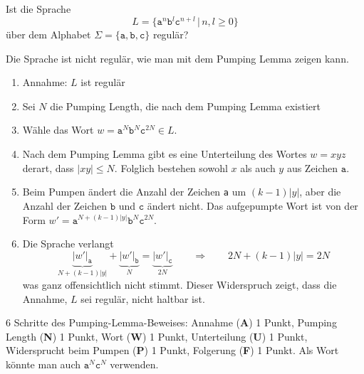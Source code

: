 Ist die Sprache
\[
L = \{ \texttt{a}^n \texttt{b}^l \texttt{c}^{n+l}\,|\, n,l\ge 0\}
\]
über dem Alphabet $\Sigma=\{\texttt{a},\texttt{b},\texttt{c}\}$ regulär?

\begin{loesung}
Die Sprache ist nicht regulär, wie man mit dem Pumping Lemma zeigen kann.
\begin{enumerate}
\item Annahme: $L$ ist regulär
\item Sei $N$ die Pumping Length, die nach dem Pumping Lemma existiert
\item Wähle das Wort $w=\texttt{a}^N \texttt{b}^N \texttt{c}^{2N}\in L$.
\item Nach dem Pumping Lemma gibt es eine Unterteilung des Wortes $w=xyz$
derart, dass $|xy|\le N$. Folglich bestehen sowohl $x$ als auch $y$ aus
Zeichen $\texttt{a}$.
\item Beim Pumpen ändert die Anzahl der Zeichen \texttt{a} um $(k-1)|y|$,
aber die Anzahl der Zeichen $\texttt{b}$ und $\texttt{c}$ ändert nicht.
Das aufgepumpte Wort ist von der Form
$w'=\texttt{a}^{N+(k-1)|y|}\texttt{b}^N\texttt{c}^{2N}$.
\item
Die Sprache verlangt
\[
\underbrace{|w'|_{\texttt{a}}}_{\displaystyle N+(k-1)|y|}
+
\underbrace{|w'|_{\texttt{b}}}_{\displaystyle N}
=
\underbrace{|w'|_{\texttt{c}}}_{\displaystyle 2N}
\qquad\Rightarrow\qquad
2N+(k-1)|y|=2N
\]
was ganz offensichtlich nicht stimmt.
Dieser Widerspruch zeigt, dass die Annahme, $L$ sei regulär,
nicht haltbar ist.
\qedhere
\end{enumerate}
\end{loesung}

\begin{bewertung}
6 Schritte des Pumping-Lemma-Beweises:
Annahme ({\bf A}) 1 Punkt, 
Pumping Length ({\bf N}) 1 Punkt,
Wort ({\bf W}) 1 Punkt,
Unterteilung ({\bf U}) 1 Punkt,
Widersprucht beim Pumpen ({\bf P}) 1 Punkt,
Folgerung ({\bf F}) 1 Punkt.
Als Wort könnte man auch $\texttt{a}^N\texttt{c}^N$ verwenden.
\end{bewertung}

